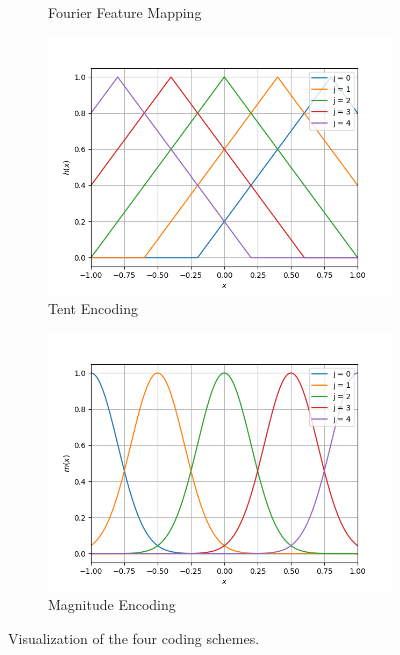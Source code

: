 \documentclass{article}
\begin{document}
\begin{figure}[!h]
\begin{subfigure}{.5\textwidth}
  \caption{Fourier Feature Mapping}
  \label{PlotFE}
\end{subfigure}
\begin{subfigure}{.5\textwidth}
  \includegraphics[width=\textwidth]{Bilder/plot_tent.png}
  \caption{Tent Encoding}
  \label{PlotTE}
\end{subfigure}
\begin{subfigure}{.5\textwidth}
  \includegraphics[width=\textwidth]{Bilder/plot_magnitude_varianz.png}
  \caption{Magnitude Encoding}
  \label{PlotME}
\end{subfigure}
\caption{Visualization of the four coding schemes.}
\label{Plots}
\end{figure}
\end{document}
